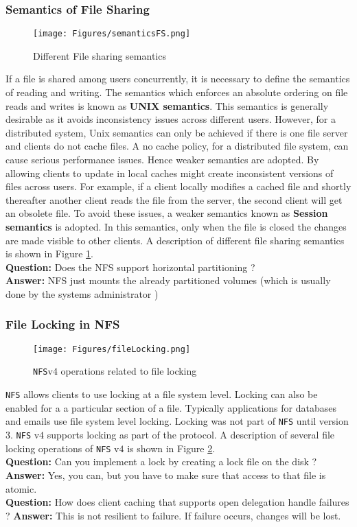 \documentclass[twoside]{article}
\begin{document}
\subsubsection{Semantics of File Sharing}
 
\begin{figure}[htbp]
\centering
\texttt{[image: Figures/semanticsFS.png]}
\caption{Different File sharing semantics} \label{fss}
\end{figure}
If a file is shared among users concurrently, it is necessary to define the semantics of reading and writing. The semantics which enforces an absolute ordering on file reads and writes is known as {\bf UNIX semantics}. This semantics is generally desirable as it avoids inconsistency issues across different users. However, for a distributed system, Unix semantics can only be achieved if there is one file server and clients do not cache files. A no cache policy, for a distributed file system, can cause serious performance issues. Hence weaker semantics are adopted. By allowing clients to update in local caches might create inconsistent versions of files across users. For example, if a client locally modifies a cached file and shortly thereafter another client reads the file from the server, the second client will get an obsolete file. To avoid these issues, a weaker semantics known as {\bf Session semantics} is adopted. In this semantics, only when the file is closed the changes are made visible to other clients. A description of different file sharing semantics is shown in Figure \ref{fss}. \\
\textbf{Question:} Does the NFS support horizontal partitioning ? \\ 
\textbf{Answer:} NFS just mounts the already partitioned volumes (which is usually done by the systems administrator )

\subsubsection{File Locking in NFS}
\begin{figure}[htbp]
\centering
\texttt{[image: Figures/fileLocking.png]}
\caption{\texttt{NFS}v$4$ operations related to file locking} \label{fl}
\end{figure}
\texttt{NFS} allows clients to use locking at a file system level. Locking can also be enabled for a a particular section  of a file. Typically applications for databases and emails use file system level locking. Locking was not part of \texttt{NFS} until version $3$. \texttt{NFS} v$4$ supports locking as part of the protocol. A description of several file locking operations of \texttt{NFS} v$4$ is shown in Figure \ref{fl}. \\ 
\textbf{Question:} Can you implement a lock by creating a lock file on the disk ? \\ 
\textbf{Answer:} Yes, you can, but you have to make sure that access to that file is atomic. \\ 
\textbf{Question: }How does client caching that supports open delegation handle failures ?
\textbf{Answer: } This is not resilient to failure. If failure occurs, changes will be lost. \\ 
\end{document}
